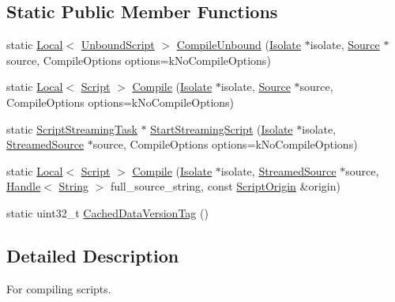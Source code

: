 \subsection*{Static Public Member Functions}
\begin{DoxyCompactItemize}
\item 
static \hyperlink{classv8_1_1_local}{Local}$<$ \hyperlink{classv8_1_1_unbound_script}{Unbound\+Script} $>$ \hyperlink{classv8_1_1_script_compiler_a5f590f94e2705d12392c17b7fa097e1d}{Compile\+Unbound} (\hyperlink{classv8_1_1_isolate}{Isolate} $\ast$isolate, \hyperlink{classv8_1_1_script_compiler_1_1_source}{Source} $\ast$source, Compile\+Options options=k\+No\+Compile\+Options)
\item 
static \hyperlink{classv8_1_1_local}{Local}$<$ \hyperlink{classv8_1_1_script}{Script} $>$ \hyperlink{classv8_1_1_script_compiler_a4cef8b34c2744f6508a9ce53182c19bf}{Compile} (\hyperlink{classv8_1_1_isolate}{Isolate} $\ast$isolate, \hyperlink{classv8_1_1_script_compiler_1_1_source}{Source} $\ast$source, Compile\+Options options=k\+No\+Compile\+Options)
\item 
static \hyperlink{classv8_1_1_script_compiler_1_1_script_streaming_task}{Script\+Streaming\+Task} $\ast$ \hyperlink{classv8_1_1_script_compiler_a406bb44ef02d644d94bccd3f7b04f2d4}{Start\+Streaming\+Script} (\hyperlink{classv8_1_1_isolate}{Isolate} $\ast$isolate, \hyperlink{classv8_1_1_script_compiler_1_1_streamed_source}{Streamed\+Source} $\ast$source, Compile\+Options options=k\+No\+Compile\+Options)
\item 
static \hyperlink{classv8_1_1_local}{Local}$<$ \hyperlink{classv8_1_1_script}{Script} $>$ \hyperlink{classv8_1_1_script_compiler_a45b17bbe1da31c32e3783b91bdde9fcb}{Compile} (\hyperlink{classv8_1_1_isolate}{Isolate} $\ast$isolate, \hyperlink{classv8_1_1_script_compiler_1_1_streamed_source}{Streamed\+Source} $\ast$source, \hyperlink{classv8_1_1_handle}{Handle}$<$ \hyperlink{classv8_1_1_string}{String} $>$ full\+\_\+source\+\_\+string, const \hyperlink{classv8_1_1_script_origin}{Script\+Origin} \&origin)
\item 
static uint32\+\_\+t \hyperlink{classv8_1_1_script_compiler_aea78877b0dccde1e587ee1ddeda1c155}{Cached\+Data\+Version\+Tag} ()
\end{DoxyCompactItemize}


\subsection{Detailed Description}
For compiling scripts. 


